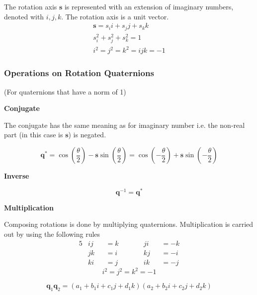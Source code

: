 \documentclass{article}
\begin{document}
The rotation axis \(\mathbf{s}\) is represented with an extension of imaginary numbers, denoted with 
\(i,j,k\). The rotation axis is a unit vector.
\vspace{-5px}
\begin{gather*}
    \mathbf{s} = s_i i + s_j j + s_k k \\
    s^2_i + s^2_j + s^2_k = 1 \\
    i^2 = j^2 = k^2 = ijk = -1
\end{gather*}

\subsubsection{Operations on Rotation Quaternions}

\begin{center}
    (For quaternions that have a norm of 1)
\end{center}

\textbf{Conjugate}

\vspace{5px}

The conjugate has the same meaning as for imaginary number i.e. the non-real part (in this case is \(\mathbf{s}\))
is negated.

\[
    \mathbf{q}^* = \cos \left(\frac{\theta}{2}\right) - \mathbf{s} \sin\left(\frac{\theta}{2}\right) =
    \cos \left(- \frac{\theta}{2}\right) + \mathbf{s} \sin\left(- \frac{\theta}{2}\right)
\]

\textbf{Inverse}

\vspace{5px}

\[
    \mathbf{q}^{-1} = \mathbf{q}^*
\]

\textbf{Multiplication}

\vspace{5px}

Composing rotations is done by multiplying quaternions. Multiplication is carried out by using the following rules
\vspace{-5px}
\begin{alignat*}{5}
    &ij &&= k \qquad &&ji &&= -k\\
    &jk &&= i \qquad &&kj &&= -i\\
    &ki &&= j \qquad &&ik &&= -j
\end{alignat*}
\[
    i^2 = j^2 = k^2 = -1
\]

\[
    \mathbf{q}_1 \mathbf{q}_2 = (a_1 + b_1 i + c_1 j + d_1 k)(a_2 + b_2 i + c_2 j + d_2 k)
\]
\end{document}
